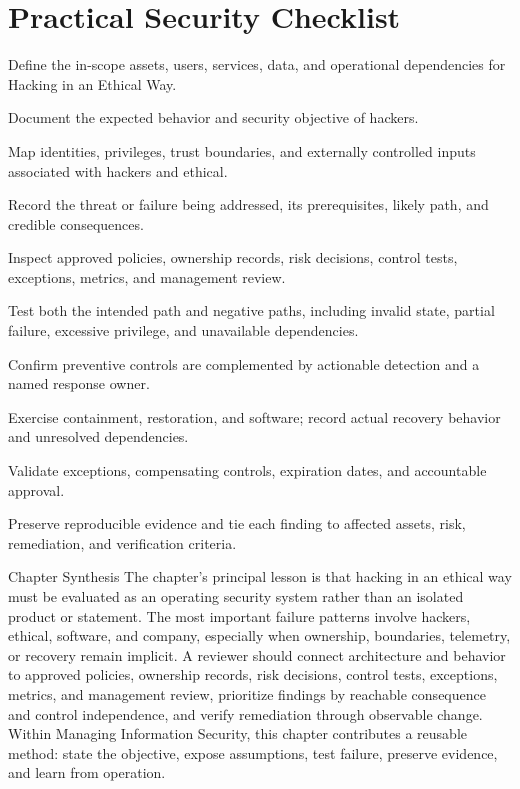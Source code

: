 \documentclass[11pt,letterpaper]{article}
\begin{document}
\section*{Practical Security Checklist}
\begin{CornellChecklist}
\item Define the in-scope assets, users, services, data, and operational dependencies for Hacking in an Ethical Way.
\item Document the expected behavior and security objective of hackers.
\item Map identities, privileges, trust boundaries, and externally controlled inputs associated with hackers and ethical.
\item Record the threat or failure being addressed, its prerequisites, likely path, and credible consequences.
\item Inspect approved policies, ownership records, risk decisions, control tests, exceptions, metrics, and management review.
\item Test both the intended path and negative paths, including invalid state, partial failure, excessive privilege, and unavailable dependencies.
\item Confirm preventive controls are complemented by actionable detection and a named response owner.
\item Exercise containment, restoration, and software; record actual recovery behavior and unresolved dependencies.
\item Validate exceptions, compensating controls, expiration dates, and accountable approval.
\item Preserve reproducible evidence and tie each finding to affected assets, risk, remediation, and verification criteria.
\end{CornellChecklist}
\begin{CornellSummaryBox}{Chapter Synthesis}
The chapter's principal lesson is that hacking in an ethical way must be evaluated as an operating security system rather than an isolated product or statement. The most important failure patterns involve hackers, ethical, software, and company, especially when ownership, boundaries, telemetry, or recovery remain implicit. A reviewer should connect architecture and behavior to approved policies, ownership records, risk decisions, control tests, exceptions, metrics, and management review, prioritize findings by reachable consequence and control independence, and verify remediation through observable change. Within Managing Information Security, this chapter contributes a reusable method: state the objective, expose assumptions, test failure, preserve evidence, and learn from operation.
\end{CornellSummaryBox}
\end{document}
